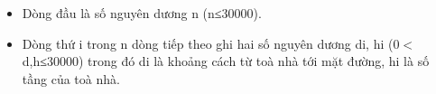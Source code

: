 \begin{itemize}
	\item Dòng đầu là số nguyên dương n (n≤30000).
	\item Dòng thứ i trong n dòng tiếp theo ghi hai số nguyên dương di, hi (0$<$d,h≤30000) trong đó di là khoảng cách từ toà nhà tới mặt đường, hi là số tầng của toà nhà.
\end{itemize}
